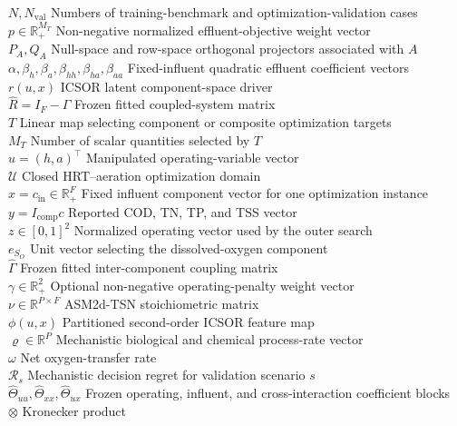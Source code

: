 \documentclass[a4paper,fleqn]{cas-sc}
\newcommand{\R}{\mathbb{R}}
\begin{document}
\begin{tabbing}
$N,N_{\mathrm{val}}$ \> Numbers of training-benchmark and optimization-validation cases \\
$p\in\R_+^{M_T}$ \> Non-negative normalized effluent-objective weight vector \\
$P_A,Q_A$ \> Null-space and row-space orthogonal projectors associated with $A$ \\
$\alpha,\beta_h,\beta_a,\beta_{hh},\beta_{ha},\beta_{aa}$ \> Fixed-influent quadratic effluent coefficient vectors \\
$r(u,x)$ \> ICSOR latent component-space driver \\
$\widehat R=I_F-\widehat\Gamma$ \> Frozen fitted coupled-system matrix \\
$T$ \> Linear map selecting component or composite optimization targets \\
$M_T$ \> Number of scalar quantities selected by $T$ \\
$u=(h,a)^\top$ \> Manipulated operating-variable vector \\
$\mathcal U$ \> Closed HRT--aeration optimization domain \\
$x=c_{\mathrm{in}}\in\R_+^F$ \> Fixed influent component vector for one optimization instance \\
$y=I_{\mathrm{comp}}c$ \> Reported COD, TN, TP, and TSS vector \\
$z\in[0,1]^2$ \> Normalized operating vector used by the outer search \\
$e_{S_O}$ \> Unit vector selecting the dissolved-oxygen component \\
$\widehat\Gamma$ \> Frozen fitted inter-component coupling matrix \\
$\gamma\in\R_+^2$ \> Optional non-negative operating-penalty weight vector \\
$\nu\in\R^{P\times F}$ \> ASM2d-TSN stoichiometric matrix \\
$\phi(u,x)$ \> Partitioned second-order ICSOR feature map \\
$\varrho\in\R^P$ \> Mechanistic biological and chemical process-rate vector \\
$\omega$ \> Net oxygen-transfer rate \\
$\mathcal R_s$ \> Mechanistic decision regret for validation scenario $s$ \\
$\widehat\Theta_{uu},\widehat\Theta_{xx},\widehat\Theta_{ux}$ \> Frozen operating, influent, and cross-interaction coefficient blocks \\
$\otimes$ \> Kronecker product \\
\end{tabbing}
\end{document}
